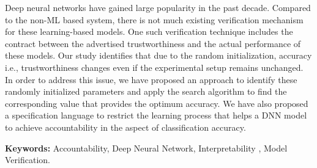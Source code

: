 Deep neural networks have gained large popularity in the past decade. Compared to the non-ML based system, there is not much existing verification mechanism for these learning-based models. One such verification technique includes the contract between the advertised trustworthiness and the actual performance of these models. Our study identifies that due to the random initialization, accuracy i.e., trustworthiness changes even if the experimental setup remains unchanged. In order to address this issue, we have proposed an approach to identify these randomly initialized parameters and apply the search algorithm to find the corresponding value that provides the optimum accuracy. We have also proposed a specification language to restrict the learning process that helps a DNN model to achieve accountability in the aspect of classification accuracy.

\textbf{Keywords:} Accountability, Deep Neural Network, Interpretability , Model Verification.